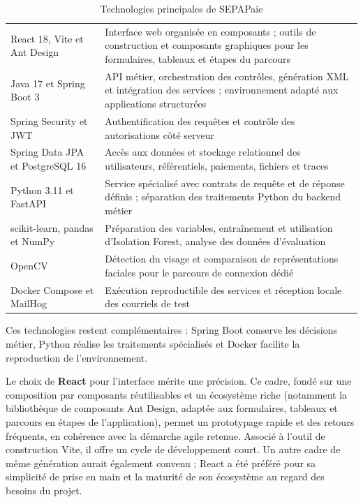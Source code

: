 \begin{table}[H]
\centering
\small
\renewcommand{\arraystretch}{1.25}
\tablestyle
\begin{tabularx}{\textwidth}{|>{\raggedright\arraybackslash}p{3.7cm}|Y|}
\hline
{} &  \\
\hline
React 18, Vite et Ant Design & Interface web organisée en composants ; outils de construction et composants graphiques pour les formulaires, tableaux et étapes du parcours \\
\hline
Java 17 et Spring Boot 3 & API métier, orchestration des contrôles, génération XML et intégration des services ; environnement adapté aux applications structurées \\
\hline
Spring Security et JWT & Authentification des requêtes et contrôle des autorisations côté serveur \\
\hline
Spring Data JPA et PostgreSQL 16 & Accès aux données et stockage relationnel des utilisateurs, référentiels, paiements, fichiers et traces \\
\hline
Python 3.11 et FastAPI & Service spécialisé avec contrats de requête et de réponse définis ; séparation des traitements Python du backend métier \\
\hline
scikit-learn, pandas et NumPy & Préparation des variables, entraînement et utilisation d'Isolation Forest, analyse des données d'évaluation \\
\hline
OpenCV & Détection du visage et comparaison de représentations faciales pour le parcours de connexion dédié \\
\hline
Docker Compose et MailHog & Exécution reproductible des services et réception locale des courriels de test \\
\hline
\end{tabularx}
\caption{Technologies principales de SEPAPaie}
\label{tab:technologies}
\end{table}

Ces technologies restent complémentaires : Spring Boot conserve les décisions métier, Python réalise les traitements spécialisés et Docker facilite la reproduction de l'environnement.

Le choix de \textbf{React} pour l'interface mérite une précision. Ce cadre, fondé sur une composition par composants réutilisables et un écosystème riche (notamment la bibliothèque de composants Ant Design, adaptée aux formulaires, tableaux et parcours en étapes de l'application), permet un prototypage rapide et des retours fréquents, en cohérence avec la démarche agile retenue. Associé à l'outil de construction Vite, il offre un cycle de développement court. Un autre cadre de même génération aurait également convenu ; React a été préféré pour sa simplicité de prise en main et la maturité de son écosystème au regard des besoins du projet.

